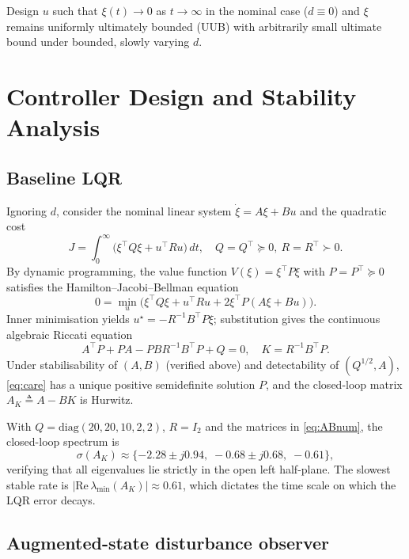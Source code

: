 \documentclass[conference]{IEEEtran}
\begin{document}
Design $u$ such that $\xi(t)\to 0$ as $t\to\infty$ in the nominal case
($d\equiv 0$) and $\xi$ remains uniformly ultimately bounded (UUB) with
arbitrarily small ultimate bound under bounded, slowly varying $d$.

\section{Controller Design and Stability Analysis}\label{sec:controller}

\subsection{Baseline LQR}

Ignoring $d$, consider the nominal linear system $\dot\xi=A\xi+Bu$ and the
quadratic cost
\begin{equation}
J=\int_0^\infty\bigl(\xi^\top Q\xi+u^\top Ru\bigr)\,dt,\quad
Q=Q^\top\succeq 0,\ R=R^\top\succ 0.
\label{eq:cost}
\end{equation}
By dynamic programming, the value function $V(\xi)=\xi^\top P\xi$ with
$P=P^\top\succeq 0$ satisfies the Hamilton--Jacobi--Bellman equation
\begin{equation}
0=\min_u\Big(\xi^\top Q\xi+u^\top Ru+2\xi^\top P(A\xi+Bu)\Big).
\end{equation}
Inner minimisation yields $u^\star=-R^{-1}B^\top P\xi$; substitution gives
the continuous algebraic Riccati equation
\begin{equation}
A^\top P+PA-PBR^{-1}B^\top P+Q=0,\quad K=R^{-1}B^\top P.
\label{eq:care}
\end{equation}
Under stabilisability of $(A,B)$ (verified above) and detectability of
$(Q^{1/2},A)$, \eqref{eq:care} has a unique positive semidefinite
solution $P$, and the closed-loop matrix $A_K\triangleq A-BK$ is Hurwitz.

With $Q=\mathrm{diag}(20,20,10,2,2)$, $R=I_2$ and the matrices in
\eqref{eq:ABnum}, the closed-loop spectrum is
\begin{equation}
\sigma(A_K)\approx
\{-2.28\!\pm\!j0.94,\;-0.68\!\pm\!j0.68,\;-0.61\},
\label{eq:lqrspec}
\end{equation}
verifying that all eigenvalues lie strictly in the open left half-plane.
The slowest stable rate is $|\mathrm{Re}\,\lambda_{\min}(A_K)|\approx 0.61$,
which dictates the time scale on which the LQR error decays.

\subsection{Augmented-state disturbance observer}
\end{document}
